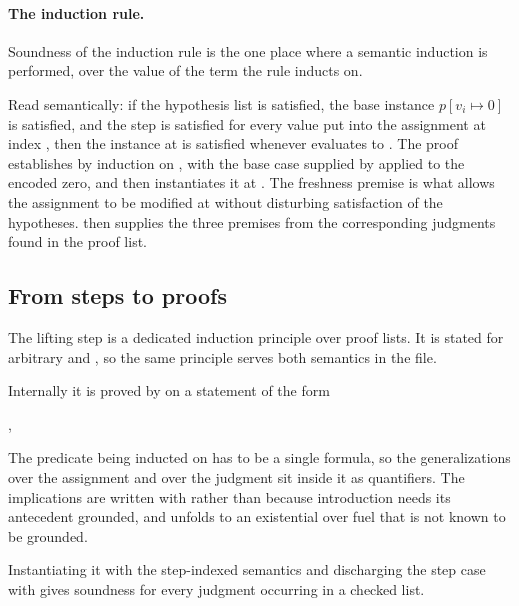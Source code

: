 \paragraph{The induction rule.}
Soundness of the induction rule is the one place where a semantic induction is
performed, over the value of the term the rule inducts on.


\noindent
Read semantically: if the hypothesis list is satisfied, the base instance
$p[v_i \mapsto 0]$ is satisfied, and the step is satisfied for every value
 put into the assignment at index , then the instance at 
is satisfied whenever  evaluates to .  The proof establishes
 by \QGA{} induction on ,
with the base case supplied by  applied to the
encoded zero, and then instantiates it at .  The freshness premise
 is what
allows the assignment to be modified at  without disturbing satisfaction
of the hypotheses.   then supplies the three
premises from the corresponding judgments found in the proof list.

\subsection{From steps to proofs}
\label{sec:list}

The lifting step is a dedicated induction principle over proof lists.  It is
stated for arbitrary  and , so the same principle serves
both semantics in the file.


\noindent
Internally it is proved by  on a statement of the form
\begin{center}
,
\end{center}
The predicate being inducted on has to be a single formula, so the
generalizations over the assignment and over the judgment sit inside it as
\QGA{} quantifiers.  The implications are written with  rather than
 because  introduction needs its antecedent grounded, and
 unfolds to an existential over fuel that is not known to be
grounded.

Instantiating it with the step-indexed semantics and discharging the step case
with  gives soundness for every judgment
occurring in a checked list.


